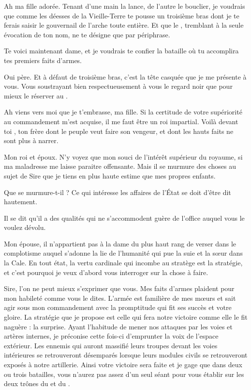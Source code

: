 \begin{drama}
  \roispeaks Ah ma fille adorée. Tenant d’une main la lance, de l’autre le bouclier, je voudrais que comme les déesses de la Vieille-Terre te pousse un troisième bras dont je te ferais saisir le gouvernail de l’arche toute entière. Et que le \campoppose{}, tremblant à la seule évocation de ton nom, ne te désigne que par périphrase.

  Te voici maintenant dame, et je voudrais te confier la bataille où tu accomplira tes premiers faits d’armes.


  \princessespeaks Oui père. Et à défaut de troisième bras, c’est la tête casquée que je me présente à vous. Vous soustrayant bien respectueusement à vous le regard noir que pour mieux le réserver au \campoppose{}.

  \roispeaks Ah viens vers moi que je t’embrasse, ma fille. Si la certitude de votre supériorité au commandement m’est acquise, il me faut être un roi impartial. Voilà devant toi \elena{}, ton frère dont le peuple veut faire son vengeur, et \general{} dont les hauts faits ne sont plus à narrer.

  \reinespeaks Mon roi et époux. N’y voyez que mon souci de l’intérêt supérieur du royaume, si ma maladresse me laisse paraitre offensante. Mais il se murmure des choses au sujet de Sire \elena{} que je tiens en plus haute estime que mes propres enfants.

  \roispeaks Que se murmure-t-il ?  Ce qui intéresse les affaires de l’État se doit d’être dit hautement.

  \reinespeaks Il se dit qu’il a des qualités qui ne s’accommodent guère de l’office auquel vous le voulez dévolu.

  \roispeaks Mon épouse, il n’appartient pas à la dame du plus haut rang de verser dans le complotisme auquel s’adonne la lie de l’humanité qui pue la suie et la sœur dans la Cale.
  En tout état, la vertu cardinale qui incombe au stratège est la stratégie,  et c’est pourquoi je veux d’abord vous interroger \general{} sur la chose à faire.

  \generalspeaks Sire, l’on ne peut mieux s’exprimer que vous. Mes faits d’armes plaident pour mon habileté comme vous le dites. L’armée est familière de mes mœurs et sait agir sous mon commandement avec la promptitude qui fit ses succès et votre gloire. La stratégie que je propose est celle qui fera notre victoire comme elle le fit naguère : la surprise. Ayant l’habitude de mener nos attaques par les voies et artères internes, je préconise cette fois-ci d’emprunter la voix de l’espace extérieur. Les ennemis qui auront massifié leurs troupes devant les voies intérieures se retrouveront désemparés lorsque leurs modules civils se retrouveront exposés à notre artillerie. Ainsi votre victoire sera faite et je gage que dans deux ou trois batailles, vous n’aurez pas assez d’un seul séant pour vous établir sur les deux trônes du \campprincipal{} et du \campoppose{}.


\end{drama}
